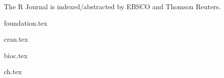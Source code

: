 \documentclass[a4paper]{report}
\begin{document}
\begin{center}
\begin{minipage}{0.65\textwidth}
\begin{center}
    \bigskip The R Journal is indexed/abstracted by EBSCO and Thomson Reuters.
      
  \end{center}
    
  \end{minipage}
\end{center}

\newpage

\begin{article}
  
\end{article}
\cleardoublepage




\begin{article}
  {foundation.tex}
\end{article}
\newpage

\begin{article}
  {cran.tex}
\end{article}
\newpage

\begin{article}
  {bioc.tex}
\end{article}
\newpage

\begin{article}
  {ch.tex}
\end{article}
\newpage
\end{document}
